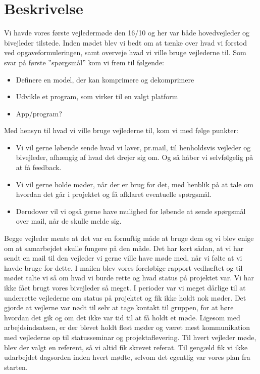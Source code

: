 \section{Beskrivelse}
Vi havde vores første vejledermøde den 16/10 og her var både hovedvejleder og bivejleder tilstede. Inden mødet blev vi bedt om at tænke over hvad vi forstod ved opgaveformuleringen, samt overveje hvad vi ville bruge vejlederne til. 
Som svar på første ”spørgsmål” kom vi frem til følgende:
\begin{itemize}
\item	Definere en model, der kan komprimere og dekomprimere

\item Udvikle et program, som virker til en valgt platform


\item	App/program?
\end{itemize}
Med hensyn til hvad vi ville bruge vejlederne til, kom vi med følge punkter:
\begin{itemize}
\item	Vi vil gerne løbende sende hvad vi laver, pr.mail, til henholdsvis vejleder og bivejleder, afhængig af hvad det drejer sig om. Og så håber vi selvfølgelig på at få feedback.

\item	 Vi vil gerne holde møder, når der er brug for det, med henblik på at tale om hvordan det går i projektet og få afklaret eventuelle spørgsmål.

\item	Derudover vil vi også gerne have mulighed for løbende at sende spørgsmål over mail, når de skulle melde sig.
\end{itemize}Begge vejleder mente at det var en fornuftig måde at bruge dem og vi blev enige om at samarbejdet skulle fungere på den måde. Det har kørt sådan, at vi har sendt en mail til den vejleder vi gerne ville have møde med, når vi følte at vi havde bruge for dette. I mailen blev vores foreløbige rapport vedhæftet og til mødet talte vi så om hvad vi burde rette og hvad status på projektet var. Vi har ikke fået brugt vores bivejleder så meget. I perioder var vi meget dårlige til at underrette vejlederne om status på projektet og fik ikke holdt nok møder. Det gjorde at vejlerne var nødt til selv at tage kontakt til gruppen, for at høre hvordan det gik og om det ikke var tid til at få holdt et møde. Ligesom med arbejdsindsatsen, er der blevet holdt flest møder og været mest kommunikation med vejlederne op til statusseminar og projektaflevering. 
Til hvert vejleder møde, blev der valgt en referent, så vi altid fik skrevet referat. Til gengæld fik vi ikke udarbejdet dagsorden inden hvert mødte, selvom det egentlig var vores plan fra starten. 

